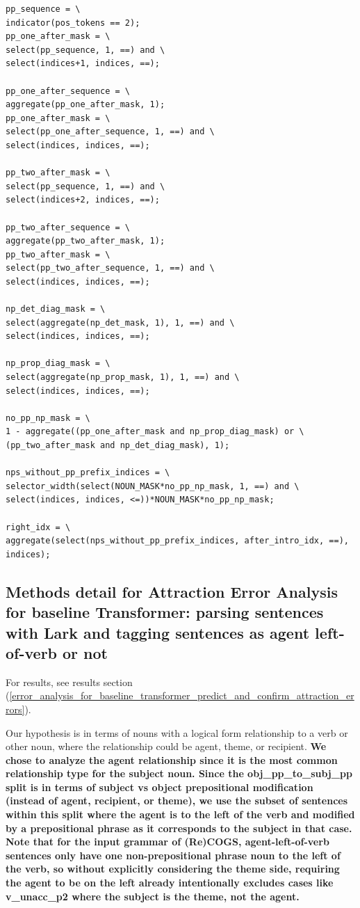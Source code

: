 \documentclass[11pt]{article}
\begin{document}
\begin{tiny}
\begin{verbatim}
pp_sequence = \
indicator(pos_tokens == 2);
pp_one_after_mask = \
select(pp_sequence, 1, ==) and \
select(indices+1, indices, ==);

pp_one_after_sequence = \
aggregate(pp_one_after_mask, 1);
pp_one_after_mask = \
select(pp_one_after_sequence, 1, ==) and \
select(indices, indices, ==);

pp_two_after_mask = \
select(pp_sequence, 1, ==) and \
select(indices+2, indices, ==);

pp_two_after_sequence = \
aggregate(pp_two_after_mask, 1);
pp_two_after_mask = \
select(pp_two_after_sequence, 1, ==) and \
select(indices, indices, ==);

np_det_diag_mask = \
select(aggregate(np_det_mask, 1), 1, ==) and \
select(indices, indices, ==);

np_prop_diag_mask = \
select(aggregate(np_prop_mask, 1), 1, ==) and \
select(indices, indices, ==);

no_pp_np_mask = \
1 - aggregate((pp_one_after_mask and np_prop_diag_mask) or \
(pp_two_after_mask and np_det_diag_mask), 1);

nps_without_pp_prefix_indices = \
selector_width(select(NOUN_MASK*no_pp_np_mask, 1, ==) and \
select(indices, indices, <=))*NOUN_MASK*no_pp_np_mask;

right_idx = \
aggregate(select(nps_without_pp_prefix_indices, after_intro_idx, ==), indices);
\end{verbatim}
\end{tiny}

\clearpage
\subsection{Methods detail for Attraction Error Analysis for \citep{Wu2023} baseline Transformer: parsing sentences with Lark and tagging sentences as agent left-of-verb or not  }
\label{appendix_error_analysis_for_baseline_transformer_methods}

For results, see results section (\ref{error_analysis_for_baseline_transformer_predict_and_confirm_attraction_errors}).

Our hypothesis is in terms of nouns with a logical form relationship to a verb or other noun, where the relationship could be agent, theme, or recipient.
\textbf{We chose to analyze the agent relationship since it is the most common relationship type for the subject noun. Since the obj\_pp\_to\_subj\_pp split is in terms of subject vs object prepositional modification (instead of agent, recipient, or theme), we use the subset of sentences within this split where the agent is to the left of the verb and modified by a prepositional phrase as it corresponds to the subject in that case. Note that for the input grammar of (Re)COGS, agent-left-of-verb sentences only have one non-prepositional phrase noun to the left of the verb, so without explicitly considering the theme side, requiring the agent to be on the left already intentionally excludes cases like v\_unacc\_p2 where the subject is the theme, not the agent.}
\end{document}
